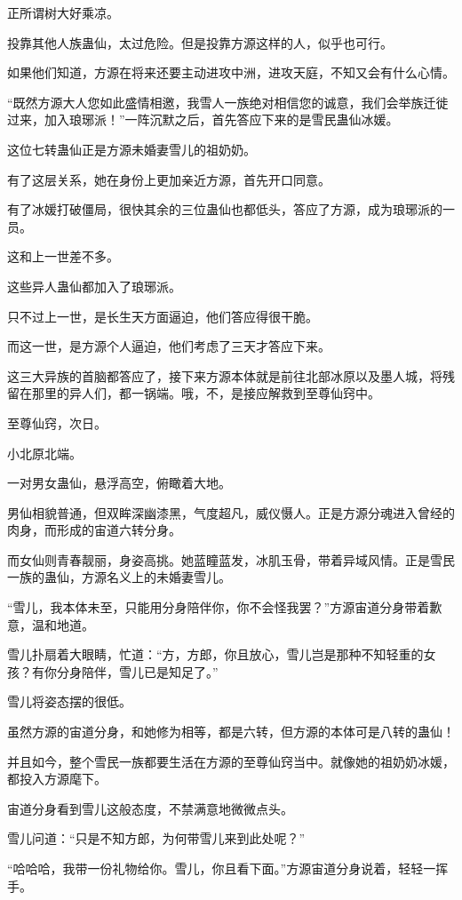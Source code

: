 \begin{this_body}
正所谓树大好乘凉。

投靠其他人族蛊仙，太过危险。但是投靠方源这样的人，似乎也可行。

如果他们知道，方源在将来还要主动进攻中洲，进攻天庭，不知又会有什么心情。

“既然方源大人您如此盛情相邀，我雪人一族绝对相信您的诚意，我们会举族迁徙过来，加入琅琊派！”一阵沉默之后，首先答应下来的是雪民蛊仙冰媛。

这位七转蛊仙正是方源未婚妻雪儿的祖奶奶。

有了这层关系，她在身份上更加亲近方源，首先开口同意。

有了冰媛打破僵局，很快其余的三位蛊仙也都低头，答应了方源，成为琅琊派的一员。

这和上一世差不多。

这些异人蛊仙都加入了琅琊派。

只不过上一世，是长生天方面逼迫，他们答应得很干脆。

而这一世，是方源个人逼迫，他们考虑了三天才答应下来。

这三大异族的首脑都答应了，接下来方源本体就是前往北部冰原以及墨人城，将残留在那里的异人们，都一锅端。哦，不，是接应解救到至尊仙窍中。

至尊仙窍，次日。

小北原北端。

一对男女蛊仙，悬浮高空，俯瞰着大地。

男仙相貌普通，但双眸深幽漆黑，气度超凡，威仪慑人。正是方源分魂进入曾经的肉身，而形成的宙道六转分身。

而女仙则青春靓丽，身姿高挑。她蓝瞳蓝发，冰肌玉骨，带着异域风情。正是雪民一族的蛊仙，方源名义上的未婚妻雪儿。

“雪儿，我本体未至，只能用分身陪伴你，你不会怪我罢？”方源宙道分身带着歉意，温和地道。

雪儿扑扇着大眼睛，忙道：“方，方郎，你且放心，雪儿岂是那种不知轻重的女孩？有你分身陪伴，雪儿已是知足了。”

雪儿将姿态摆的很低。

虽然方源的宙道分身，和她修为相等，都是六转，但方源的本体可是八转的蛊仙！

并且如今，整个雪民一族都要生活在方源的至尊仙窍当中。就像她的祖奶奶冰媛，都投入方源麾下。

宙道分身看到雪儿这般态度，不禁满意地微微点头。

雪儿问道：“只是不知方郎，为何带雪儿来到此处呢？”

“哈哈哈，我带一份礼物给你。雪儿，你且看下面。”方源宙道分身说着，轻轻一挥手。


\end{this_body}
